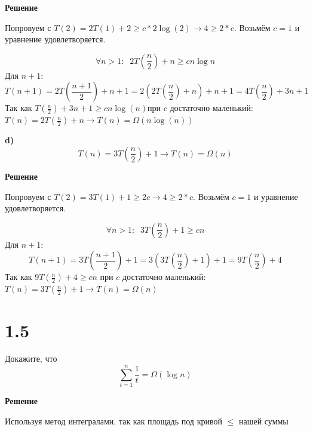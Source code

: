 \documentclass{article}
\begin{document}
\textbf{Решение}

Попровуем с $T(2) = 2T(1) + 2 \geq c*2\log (2) \longrightarrow 4 \geq 2*c$.
Возьмём $c = 1$ и уравнение удовлетворяется.

\begin{equation*}
    \forall n > 1 : \; \; 2T\left(\frac{n}{2}\right) + n \geq cn\log n
\end{equation*}
Для $n + 1$:
\begin{equation*}
    T(n + 1) = 2T\left(\frac{n + 1}{2}\right) + n + 1 =  2(2T\left(\frac{n}{2}\right) + n) + n + 1 = 4T\left(\frac{n}{2}\right) + 3n + 1
\end{equation*}
Так как $T\left(\frac{n}{2}\right) + 3n + 1 \geq cn\log (n)$при $c$ достаточно маленький:
$T(n) = 2T\left(\frac{n}{2}\right) + n \longrightarrow T(n) = \Omega (n\log (n))$

\bigskip
\bigskip
\textbf{d)}
\begin{equation*}
    T(n) = 3T\left(\frac{n}{2}\right) + 1 \longrightarrow T(n) = \Omega (n)
\end{equation*}

\textbf{Решение}

Попровуем с $T(2) = 3T(1) + 1 \geq 2c \longrightarrow 4 \geq 2*c$.
Возьмём $c = 1$ и уравнение удовлетворяется.

\begin{equation*}
    \forall n > 1 : \; \; 3T\left(\frac{n}{2}\right) + 1 \geq cn
\end{equation*}
Для $n + 1$:
\begin{equation*}
    T(n + 1) = 3T\left(\frac{n + 1}{2}\right) + 1 =  3\left(3T\left(\frac{n}{2}\right) + 1\right) + 1 = 9T\left(\frac{n}{2}\right) + 4
\end{equation*}
Так как $9T\left(\frac{n}{2}\right) + 4 \geq cn$  при $c$ достаточно маленький:\\
$T(n) = 3T\left(\frac{n}{2}\right) + 1 \longrightarrow T(n) = \Omega (n)$




\section*{1.5}
Докажите, что 
\begin{equation*}
    \sum_{t=1}^{n}\dfrac{1}{t}=\Omega (\log n)
\end{equation*}

\textbf{Решение}

Используя метод интегралами, так как площадь под кривой $\leq$ нашей суммы
\end{document}
